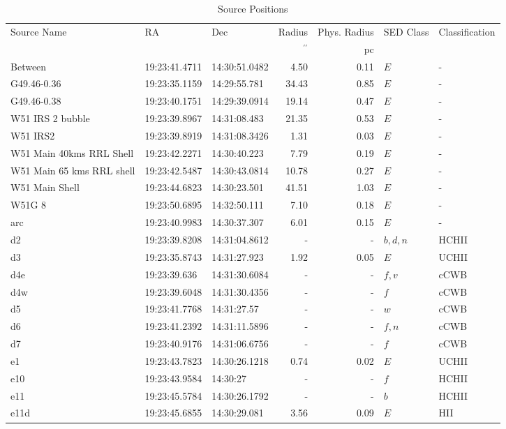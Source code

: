 \begin{table*}[htp]
\caption{Source Positions}
\begin{tabular}{lllrrll}
\label{tab:positions}
Source Name & RA & Dec & Radius & Phys. Radius & SED Class & Classification \\
 &  &  & $\mathrm{{}^{\prime\prime}}$ & $\mathrm{pc}$ &  &  \\
\hline
Between & 19:23:41.4711 & 14:30:51.0482 & 4.50 & 0.11 & $E$ & - \\
G49.46-0.36 & 19:23:35.1159 & 14:29:55.781 & 34.43 & 0.85 & $E$ & - \\
G49.46-0.38 & 19:23:40.1751 & 14:29:39.0914 & 19.14 & 0.47 & $E$ & - \\
W51 IRS 2 bubble & 19:23:39.8967 & 14:31:08.483 & 21.35 & 0.53 & $E$ & - \\
W51 IRS2 & 19:23:39.8919 & 14:31:08.3426 & 1.31 & 0.03 & $E$ & - \\
W51 Main 40kms RRL Shell & 19:23:42.2271 & 14:30:40.223 & 7.79 & 0.19 & $E$ & - \\
W51 Main 65 kms RRL shell & 19:23:42.5487 & 14:30:43.0814 & 10.78 & 0.27 & $E$ & - \\
W51 Main Shell & 19:23:44.6823 & 14:30:23.501 & 41.51 & 1.03 & $E$ & - \\
W51G 8 & 19:23:50.6895 & 14:32:50.111 & 7.10 & 0.18 & $E$ & - \\
arc & 19:23:40.9983 & 14:30:37.307 & 6.01 & 0.15 & $E$ & - \\
d2 & 19:23:39.8208 & 14:31:04.8612 & - & - & $b,d,n$ & HCHII \\
d3 & 19:23:35.8743 & 14:31:27.923 & 1.92 & 0.05 & $E$ & UCHII \\
d4e & 19:23:39.636 & 14:31:30.6084 & - & - & $f,v$ & cCWB \\
d4w & 19:23:39.6048 & 14:31:30.4356 & - & - & $f$ & cCWB \\
d5 & 19:23:41.7768 & 14:31:27.57 & - & - & $w$ & cCWB \\
d6 & 19:23:41.2392 & 14:31:11.5896 & - & - & $f,n$ & cCWB \\
d7 & 19:23:40.9176 & 14:31:06.6756 & - & - & $f$ & cCWB \\
e1 & 19:23:43.7823 & 14:30:26.1218 & 0.74 & 0.02 & $E$ & UCHII \\
e10 & 19:23:43.9584 & 14:30:27 & - & - & $f$ & HCHII \\
e11 & 19:23:45.5784 & 14:30:26.1792 & - & - & $b$ & HCHII \\
e11d & 19:23:45.6855 & 14:30:29.081 & 3.56 & 0.09 & $E$ & HII \\

\end{tabular}
\end{table*}
